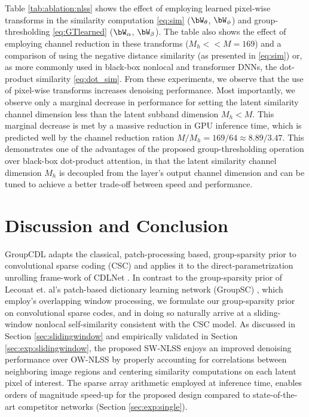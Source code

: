\documentclass[lettersize,journal]{IEEEtran}
\newcommand{\soa}{state-of-the-art }
\begin{document}
Table \ref{tab:ablation:nlss} shows the effect of employing learned pixel-wise
transforms in the similarity computation \eqref{eq:sim} ($\bW_\theta$, $\bW_\phi$) and
group-thresholding \eqref{eq:GTlearned} ($\bW_\alpha$, $\bW_\beta$). The table
also shows the effect of employing channel reduction in these transforms ($M_h
<< M = 169$) and a comparison of using the negative distance similarity (as
presented in \eqref{eq:sim}) or, as more commonly used in black-box nonlocal and
transformer DNNs, the dot-product similarity \eqref{eq:dot_sim}. From these
experiments, we observe that the use of pixel-wise transforms increases
denoising performance. Most importantly, we observe only a marginal decrease in
performance for setting the latent similarity channel dimension less than the
latent subband dimension $M_h < M$. This marginal decrease is met by a massive
reduction in GPU inference time, which is predicted well by the channel
reduction ration $M / M_h = 169/64 \approx 8.89/3.47$. This demonstrates one of
the advantages of the proposed group-thresholding operation over black-box
dot-product attention, in that the latent similarity channel dimension $M_h$ is decoupled
from the layer's output channel dimension and can be tuned
to achieve a better trade-off between speed and performance.

\section{Discussion and Conclusion}
GroupCDL adapts the classical, patch-processing based, group-sparsity
prior to convolutional sparse coding (CSC) and applies it to the
direct-parametrization unrolling frame-work of CDLNet
\cite{janjusevicCDLNet2022}.
In contrast to the group-sparsity prior of Lecouat et. al's 
patch-based dictionary learning network (GroupSC) \cite{lecouat2020nonlocal},
which employ's overlapping window processing, we formulate our group-sparsity
prior on convolutional sparse codes, and in doing so naturally arrive at a
sliding-window nonlocal self-similarity consistent with the CSC model. 
As discussed in Section \ref{sec:slidingwindow} and empirically validated in Section
\ref{sec:exp:slidingwindow}, the proposed SW-NLSS enjoys an
improved denoising performance over OW-NLSS by properly accounting for
correlations between neighboring image regions and centering similarity computations on each latent pixel of interest. The sparse array arithmetic
employed at inference time, enables orders of magnitude speed-up for the
proposed design compared to \soa competitor networks (Section
\ref{sec:exp:single}). 
\end{document}
